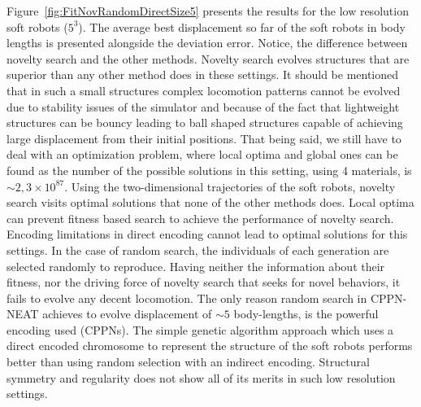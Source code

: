 Figure~\ref{fig:FitNovRandomDirectSize5} presents the results for the low resolution soft robots ($5^3$). The average best displacement so far of the soft robots in body lengths is presented alongside the deviation error. Notice, the difference between novelty search and the other methods. Novelty search evolves structures that are superior than any other method does in these settings. It should be mentioned that in such a small structures complex locomotion patterns cannot be evolved due to stability issues of the simulator and because of the fact that lightweight structures can be bouncy leading to ball shaped structures capable of achieving large displacement from their initial positions. That being said, we still have to deal with an optimization problem, where local optima and global ones can be found as the number of the possible solutions in this setting, using 4 materials, is $\sim 2,3 \times 10^{87}$. Using the two-dimensional trajectories of the soft robots, novelty search visits optimal solutions that none of the other methods does. Local optima can prevent fitness based search to achieve the performance of novelty search. Encoding limitations in direct encoding cannot lead to optimal solutions for this settings. In the case of random search, the individuals of each generation are selected randomly to reproduce. Having neither the information about their fitness, nor the driving force of novelty search that seeks for novel behaviors, it fails to evolve any decent locomotion. The only reason random search in CPPN-NEAT achieves to evolve displacement of $\sim 5$ body-lengths, is the powerful encoding used (CPPNs). The simple genetic algorithm approach which uses a direct encoded chromosome to represent the structure of the soft robots performs better than using random selection with an indirect encoding. Structural symmetry and regularity does not show all of its merits in such low resolution settings.

